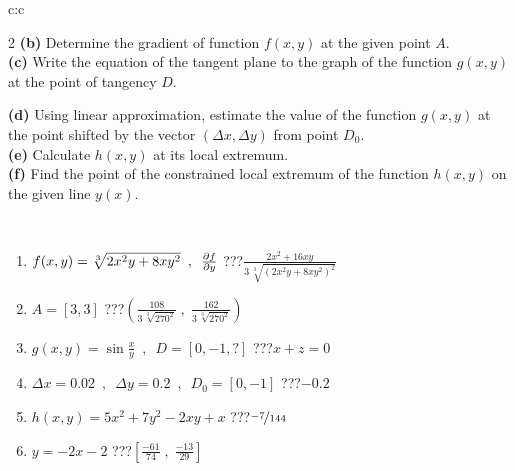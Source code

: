 \documentclass[10pt]{report}
\begin{document}
\begin{tabular}{c:c}
\begin{minipage}[c][104.5mm][t]{0.5\linewidth}
\begin{center}
\begin{minipage}{0.95\linewidth}
\begin{center}
{\begin{multicols}{2}
\textbf{(b)} Determine the gradient of function \(f(x,y)\) at the given point \(A\). \\[1mm]
\textbf{(c)} Write the equation of the tangent plane to the graph of the function \(g(x,y)\) at the point of tangency \(D\). \par \columnbreak
\textbf{(d)} Using linear approximation, estimate the value of the function \(g(x,y)\) at the point shifted by the vector \((\Delta x, \Delta y)\) from point \(D_0\). \\[1mm]
\textbf{(e)} Calculate \(h(x,y)\) at its local extremum. \\[1mm]
\textbf{(f)} Find the point of the constrained local extremum of the function \(h(x,y)\) on the given line \(y(x)\). \\[1mm]
\end{multicols}
}
\end{center}
\end{minipage}
\\[4mm]
\begin{minipage}{0.79\linewidth}
\begin{center}
\begin{varwidth}{\linewidth}
\begin{enumerate}
\normalsizerr
\item $f(x,y) = \sqrt[3]{2x^2y + 8xy^2}\enspace , \enspace \pdv{f}{y}$\quad \dotfill\; ???\;\dotfill \quad $\frac{2x^2+16xy}{3\,\sqrt[3]{(2x^2y+8xy^2)^{2}}}$
\item $A = [3, 3]$\quad \dotfill\; ???\;\dotfill \quad $\left( \frac{108}{3\,\sqrt[3]{270^2}} \;,\; \frac{162}{3\,\sqrt[3]{270^2}} \right)$
\item $g(x,y) = \sin\frac{x}{y} \enspace , \enspace D = [0, -1, ?]$\quad \dotfill\; ???\;\dotfill \quad $x+z=0$
\item $\Delta x = {0.02} \enspace,\enspace \Delta y = {0.2} \enspace,\enspace D_0 = [0,-1]$\quad \dotfill\; ???\;\dotfill \quad $-0.2$
\item $h(x,y) = 5x^2+7y^2-2xy+x$\quad \dotfill\; ???\;\dotfill \quad $\nicefrac{-7}{144}$
\item $y = -2x-2$\quad \dotfill\; ???\;\dotfill \quad $\left[\frac{-61}{74}\;,\;\frac{-13}{29}\right]$
\end{enumerate}
\end{varwidth}
\end{center}
\end{minipage}
\begin{minipage}{0.20\linewidth}
\begin{center}

\end{center}
\end{minipage}
\end{center}
\end{minipage}
\end{tabular}
\end{document}
